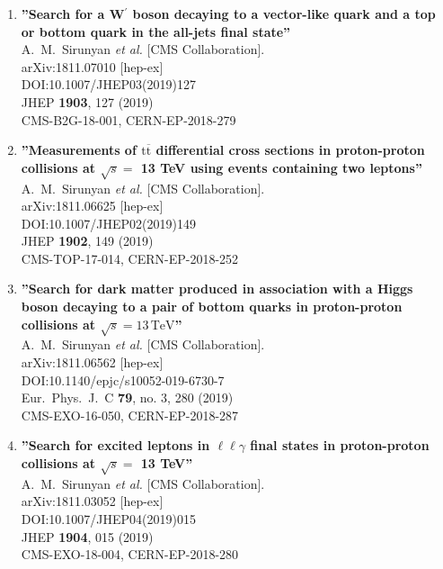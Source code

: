 \begin{enumerate}
\item%
{\bf ''Search for a W$^\prime$ boson decaying to a vector-like quark and a top or bottom quark in the all-jets final state''}
  \\{}A.~M.~Sirunyan {\it et al.} [CMS Collaboration].
  \\{}arXiv:1811.07010 [hep-ex]
  \\{}DOI:10.1007/JHEP03(2019)127
  \\{}JHEP {\bf 1903}, 127 (2019)
  \\{}CMS-B2G-18-001, CERN-EP-2018-279

\item%
{\bf ''Measurements of $\mathrm{t\overline{t}}$ differential cross sections in proton-proton collisions at $\sqrt{s}=$ 13 TeV using events containing two leptons''}
  \\{}A.~M.~Sirunyan {\it et al.} [CMS Collaboration].
  \\{}arXiv:1811.06625 [hep-ex]
  \\{}DOI:10.1007/JHEP02(2019)149
  \\{}JHEP {\bf 1902}, 149 (2019)
  \\{}CMS-TOP-17-014, CERN-EP-2018-252

\item%
{\bf ''Search for dark matter produced in association with a Higgs boson decaying to a pair of bottom quarks in proton-proton collisions at $\sqrt{s}=13\,\text {Te}\text {V} $''}
  \\{}A.~M.~Sirunyan {\it et al.} [CMS Collaboration].
  \\{}arXiv:1811.06562 [hep-ex]
  \\{}DOI:10.1140/epjc/s10052-019-6730-7
  \\{}Eur.\ Phys.\ J.\ C {\bf 79}, no. 3, 280 (2019)
  \\{}CMS-EXO-16-050, CERN-EP-2018-287

\item%
{\bf ''Search for excited leptons in $\ell\ell\gamma$ final states in proton-proton collisions at $\sqrt{s}=$ 13 TeV''}
  \\{}A.~M.~Sirunyan {\it et al.} [CMS Collaboration].
  \\{}arXiv:1811.03052 [hep-ex]
  \\{}DOI:10.1007/JHEP04(2019)015
  \\{}JHEP {\bf 1904}, 015 (2019)
  \\{}CMS-EXO-18-004, CERN-EP-2018-280


\end{enumerate}
